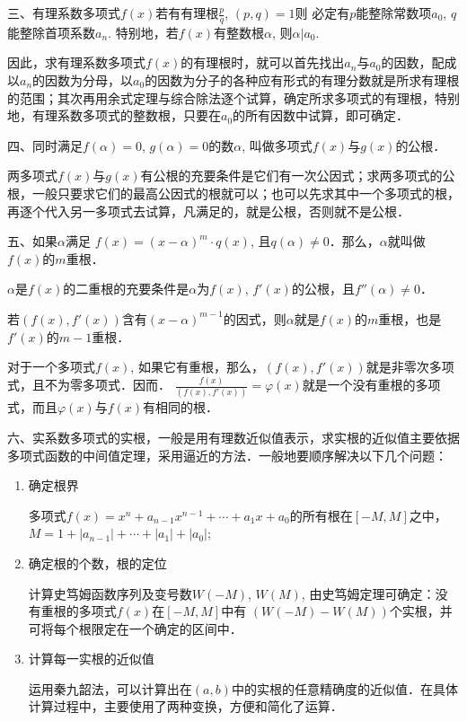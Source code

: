 三、有理系数多项式$f(x)$若有有理根$\frac{p}{q}$, $(p,q)=1$则
必定有$p$能整除常数项$a_0$, $q$能整除首项系数$a_n$. 特别地，若$f(x)$有整数根$\alpha$, 则$\alpha|a_0$. 

因此，求有理系数多项式$f(x)$的有理根时，就可以首先找出$a_n$与$a_0$的因数，配成以$a_n$的因数为分母，以$a_0$的因数为分子的各种应有形式的有理分数就是所求有理根的范围；其次再用余式定理与综合除法逐个试算，确定所求多项式的有理根，特别地，有理系数多项式的整数根，只要在$a_0$的所有因数中试算，即可确定．

四、同时满足$f(\alpha)=0$, $g(\alpha)=0$的数$\alpha$, 叫做多项式$f(x)$与$g(x)$的公根．

两多项式$f(x)$与$g(x)$有公根的充要条件是它们有一次公因式；求两多项式的公根，一般只要求它们的最高公因式的根就可以；也可以先求其中一个多项式的根，再逐个代入另一多项式去试算，凡满足的，就是公根，否则就不是公根．

五、如果$\alpha$满足
$f(x)=(x-\alpha)^m\cdot q(x)$, 且$q(\alpha)\ne 0$．那么，$\alpha$就叫做$f(x)$的$m$重根．

$\alpha$是$f(x)$的二重根的充要条件是$\alpha$为$f(x)$, $f'(x)$的公根，且$f''(\alpha)\ne 0$．

若$(f(x),f'(x))$含有$(x-\alpha)^{m-1}$的因式，则$\alpha$就是$f(x)$的$m$重根，也是$f'(x)$的$m-1$重根．

对于一个多项式$f(x)$, 如果它有重根，那么，$(f(x),f'(x))$就是非零次多项式，且不为零多项式．因而．
$\frac{f (x)}{(f (x) ,f' (x) )}=\varphi(x)$就是一个没有重根的多项式，而且$\varphi(x)$与$f(x)$有相同的根．

六、实系数多项式的实根，一般是用有理数近似值表示，求实根的近似值主要依据多项式函数的中间值定理，采用逼近的方法．一般地要顺序解决以下几个问题：
\begin{enumerate}
    \item 确定根界
    
    多项式$f(x)=x^n+a_{n-1}x^{n-1}+\cdots+a_1x+a_0$的所有根在$[-M,M]$之中，$M=1+|a_{n-1}|+\cdots+|a_1|+|a_0|$;
    
    \item 确定根的个数，根的定位
    
    计算史笃姆函数序列及变号数$W(-M)$, $W(M)$, 由史笃姆定理可确定：没有重根的多项式$f(x)$在$[-M,M]$中有
    $(W(-M)-W(M))$个实根，并可将每个根限定在一个确定的区间中．
    \item 计算每一实根的近似值
    
    运用秦九韶法，可以计算出在$(a,b)$中的实根的任意精确度的近似值．在具体计算过程中，主要使用了两种变换，方便和简化了运算．
 \end{enumerate}

